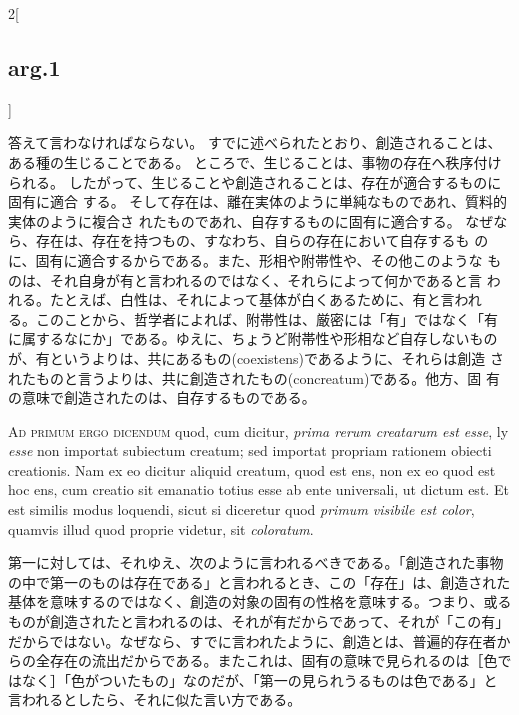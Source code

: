 \documentclass[paper=a4paper,fontsize=10pt,jafontsize=9pt,titlepage]{jlreq}
\begin{document}
\begin{paracol}{2}[\subsection{arg.1}]
\switchcolumn

答えて言わなければならない。
すでに述べられたとおり、創造されることは、ある種の生じることである。
ところで、生じることは、事物の存在へ秩序付けられる。
したがって、生じることや創造されることは、存在が適合するものに固有に適合
 する。
そして存在は、離在実体のように単純なものであれ、質料的実体のように複合さ
 れたものであれ、自存するものに固有に適合する。
なぜなら、存在は、存在を持つもの、すなわち、自らの存在において自存するも
 のに、固有に適合するからである。また、形相や附帯性や、その他このような
 ものは、それ自身が有と言われるのではなく、それらによって何かであると言
 われる。たとえば、白性は、それによって基体が白くあるために、有と言われ
 る。このことから、哲学者によれば、附帯性は、厳密には「有」ではなく「有
 に属するなにか」である。ゆえに、ちょうど附帯性や形相など自存しないもの
 が、有というよりは、共にあるもの(coexistens)であるように、それらは創造
 されたものと言うよりは、共に創造されたもの(concreatum)である。他方、固
 有の意味で創造されたのは、自存するものである。

\switchcolumn*[\subsection{ad.1}]

{\scshape Ad primum ergo dicendum} quod, cum dicitur, {\itshape prima
rerum creatarum est esse}, ly {\itshape esse} non importat subiectum
creatum; sed importat propriam rationem obiecti creationis. Nam ex eo
dicitur aliquid creatum, quod est ens, non ex eo quod est hoc ens, cum
creatio sit emanatio totius esse ab ente universali, ut dictum est. Et
est similis modus loquendi, sicut si diceretur quod {\itshape primum
visibile est color}, quamvis illud quod proprie videtur, sit {\itshape
coloratum}.

\switchcolumn

第一に対しては、それゆえ、次のように言われるべきである。「創造された事物
の中で第一のものは存在である」と言われるとき、この「存在」は、創造された
基体を意味するのではなく、創造の対象の固有の性格を意味する。つまり、或る
ものが創造されたと言われるのは、それが有だからであって、それが「この有」
だからではない。なぜなら、すでに言われたように、創造とは、普遍的存在者か
らの全存在の流出だからである。またこれは、固有の意味で見られるのは［色で
はなく］「色がついたもの」なのだが、「第一の見られうるものは色である」と
言われるとしたら、それに似た言い方である。

\switchcolumn*[\subsection{ad.2}]


\end{paracol}
\end{document}

